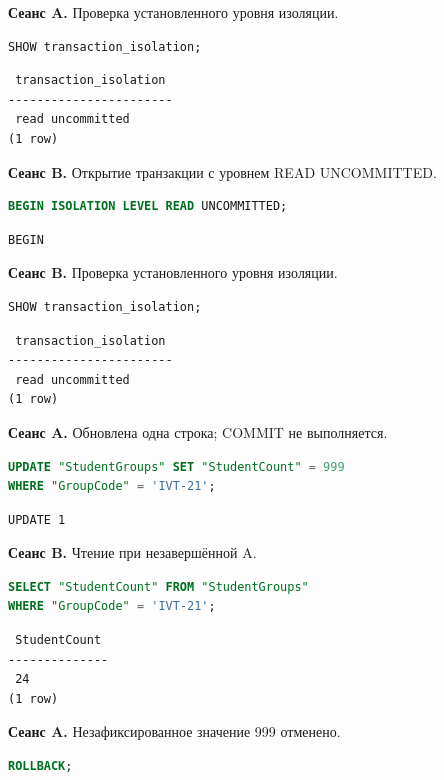 \documentclass[12pt,a4paper]{article}
\begin{document}
\textbf{Сеанс A.} Проверка установленного уровня изоляции.
\begin{lstlisting}[language=SQL]
SHOW transaction_isolation;
\end{lstlisting}

\begin{lstlisting}
 transaction_isolation
-----------------------
 read uncommitted
(1 row)
\end{lstlisting}

\textbf{Сеанс B.} Открытие транзакции с уровнем READ UNCOMMITTED.
\begin{lstlisting}[language=SQL]
BEGIN ISOLATION LEVEL READ UNCOMMITTED;
\end{lstlisting}

\begin{lstlisting}
BEGIN
\end{lstlisting}

\textbf{Сеанс B.} Проверка установленного уровня изоляции.
\begin{lstlisting}[language=SQL]
SHOW transaction_isolation;
\end{lstlisting}

\begin{lstlisting}
 transaction_isolation
-----------------------
 read uncommitted
(1 row)
\end{lstlisting}

\textbf{Сеанс A.} Обновлена одна строка; COMMIT не выполняется.
\begin{lstlisting}[language=SQL]
UPDATE "StudentGroups" SET "StudentCount" = 999
WHERE "GroupCode" = 'IVT-21';
\end{lstlisting}

\begin{lstlisting}
UPDATE 1
\end{lstlisting}

\textbf{Сеанс B.} Чтение при незавершённой A.
\begin{lstlisting}[language=SQL]
SELECT "StudentCount" FROM "StudentGroups"
WHERE "GroupCode" = 'IVT-21';
\end{lstlisting}

\begin{lstlisting}
 StudentCount
--------------
 24
(1 row)
\end{lstlisting}

\textbf{Сеанс A.} Незафиксированное значение 999 отменено.
\begin{lstlisting}[language=SQL]
ROLLBACK;
\end{lstlisting}
\end{document}
